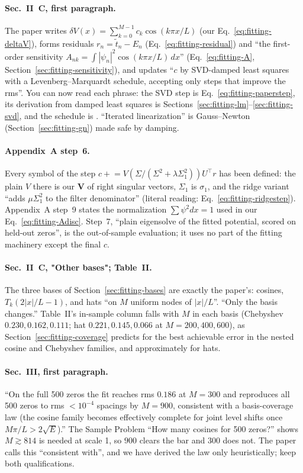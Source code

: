 \paragraph{Sec.~II~C, first paragraph.} The paper writes $\delta V(x)=\sum_{k=0}^{M-1}c_k\cos(k\pi x/L)$ (our Eq.~\eqref{eq:fitting-deltaV}), forms residuals $r_n=\tilde t_n-E_n$ (Eq.~\eqref{eq:fitting-residual}) and ``the first-order sensitivity $A_{nk}=\int|\psi_n|^2\cos(k\pi x/L)\,dx$'' (Eq.~\eqref{eq:fitting-A}, Section~\ref{sec:fitting-sensitivity}), and updates ``$c$ by SVD-damped least squares with a Levenberg--Marquardt schedule, accepting only steps that improve the rms''. You can now read each phrase: the SVD step is Eq.~\eqref{eq:fitting-paperstep}, its derivation from damped least squares is Sections~\ref{sec:fitting-lm}--\ref{sec:fitting-svd}, and the schedule is . ``Iterated linearization'' is Gauss--Newton (Section~\ref{sec:fitting-gn}) made safe by damping.

\paragraph{Appendix~A step~6.} Every symbol of the step $c\mathrel{+}=V(\Sigma/(\Sigma^2+\lambda\Sigma_1^2))U^\top r$ has been defined: the plain $V$ there is our $\bm V$ of right singular vectors, $\Sigma_1$ is $\sigma_1$, and the ridge variant ``adds $\mu\Sigma_1^2$ to the filter denominator'' (literal reading: Eq.~\eqref{eq:fitting-ridgestep}). Appendix~A step~9 states the normalization $\sum\psi^2dx=1$ used in our Eq.~\eqref{eq:fitting-Adisc}. Step~7, ``plain eigensolve of the fitted potential, scored on held-out zeros'', is the out-of-sample evaluation; it uses no part of the fitting machinery except the final $c$.

\paragraph{Sec.~II~C, "Other bases"; Table~II.} The three bases of Section~\ref{sec:fitting-bases} are exactly the paper's: cosines, $T_k(2|x|/L-1)$, and hats ``on $M$ uniform nodes of $|x|/L$''. ``Only the basis changes.'' Table~II's in-sample column falls with $M$ in each basis (Chebyshev $0.230,0.162,0.111$; hat $0.221,0.145,0.066$ at $M=200,400,600$), as Section~\ref{sec:fitting-coverage} predicts for the best achievable error in the nested cosine and Chebyshev families, and approximately for hats.

\paragraph{Sec.~III, first paragraph.} ``On the full 500 zeros the fit reaches rms $0.186$ at $M=300$ and reproduces all 500 zeros to rms $<10^{-4}$ spacings by $M=900$, consistent with a basis-coverage law (the cosine family becomes effectively complete for joint level shifts once $M\pi/L>2\sqrt{E}$).'' The Sample Problem ``How many cosines for 500 zeros?'' shows $M\gtrsim814$ is needed at scale 1, so $900$ clears the bar and $300$ does not. The paper calls this ``consistent with'', and we have derived the law only heuristically; keep both qualifications.

